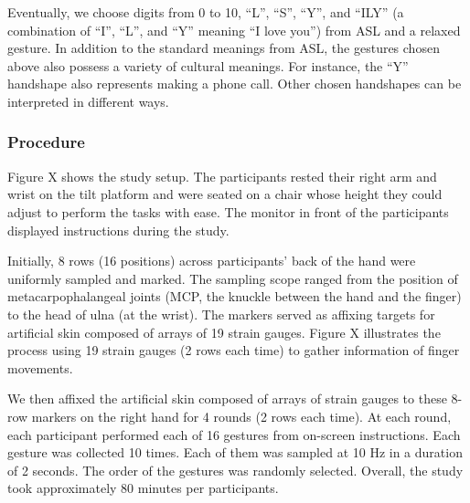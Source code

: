 \documentclass{sigchi}
\begin{document}
Eventually, we choose digits from 0 to 10, ``L'', ``S'', ``Y'', and ``ILY'' (a combination of ``I'', ``L'', and ``Y'' meaning ``I love you'') from ASL and a relaxed gesture. In addition to the standard meanings from ASL, the gestures chosen above also possess a variety of cultural meanings. For instance, the ``Y'' handshape also represents making a phone call. Other chosen handshapes can be interpreted in different ways.


\subsubsection{Procedure}
Figure X shows the study setup. The participants rested their right arm and wrist on the tilt platform and were seated on a chair whose height they could adjust to perform the tasks with ease. The monitor in front of the participants displayed instructions during the study.

Initially, 8 rows (16 positions) across participants’ back of the hand were uniformly sampled and marked. The sampling scope ranged from the position of metacarpophalangeal joints (MCP, the knuckle between the hand and the finger) to the head of ulna (at the wrist).%
 The markers served as affixing targets for artificial skin composed of arrays of 19 strain gauges. 
Figure X illustrates the process using 19 strain gauges (2 rows each time) to gather information of finger movements.

We then affixed the artificial skin composed of arrays of strain gauges to these 8-row markers on the right hand for 4 rounds (2 rows each time). 
At each round, each participant performed each of 16 gestures from on-screen instructions. Each gesture was collected 10 times. Each of them was sampled at 10 Hz in a duration of 2 seconds.
The order of the gestures was randomly selected. 
Overall, the study took approximately 80 minutes per participants.
\end{document}
